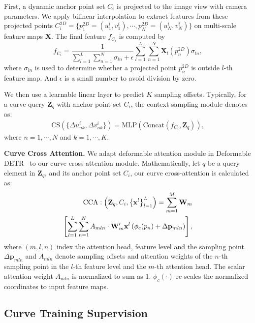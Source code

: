\documentclass[letterpaper, 10 pt, conference]{ieeeconf}
\newcommand{\bX}{\mathbf{X}}
\newcommand{\bx}{\mathbf{x}}
\newcommand{\bZ}{\mathbf{Z}}
\newcommand{\bW}{\mathbf{W}}
\newcommand{\bp}{\mathbf{p}}
\begin{document}
First, a dynamic anchor point set $C_i$ is projected to the image view with camera parameters. We apply bilinear interpolation to extract features from these projected points $C_i^{2D} = \{p_1^{2D}=(u_1^i,v_1^i), \cdots, p_N^{2D}=(u_N^i, v_N^i)\}$ on multi-scale feature maps ${\bX}$. 
The final feature $f_{C_i}$ is computed by
\begin{equation}
  f_{C_i} = \frac{1}{\sum_{l=1}^{L} \sum_{n=1}^{N}\sigma_{ln} + \epsilon} \sum_{l=1}^{L} \sum_{n=1}^{N}    \bX_{l}(p_n^{2D}) \sigma_{ln}, 
\end{equation}
where $\sigma_{ln}$ is used to determine whether a projected point $p_n^{2D}$ is outside $l$-th feature map. And $\epsilon$ is a small number to avoid division by zero.

We then use a learnable linear layer to predict $K$ sampling offsets. Typically, for a curve query $\bZ_q$ with anchor point set $C_i$, the context sampling module denotes as:
\begin{align}
    \text{CS}(\{\Delta u_{nk}^i, \Delta v_{nk}^i\}) = \text{MLP} (\text{Concat}(f_{C_i}, \bZ_q)),
\label{context-sampling}
\end{align}
where $n=1,\cdots, N$ and $k=1,\cdots, K$.

\noindent\textbf{Curve Cross Attention.} We adapt deformable attention module in Deformable
DETR~\cite{zhu2020deformable} to our curve cross-attention module.
Mathematically, let $q$ be a query element in $\bZ_q$, and its anchor point set $C_i$, our curve cross-attention is calculated as:
\begin{align}
     \text{CCA}:\left(\bZ_q, C_i,\left\{\bx^l\right\}_{l=1}^L\right)= 
     \sum_{m=1}^M \bW_m \notag \\
     \left[\sum_{l=1}^L \sum_{n=1}^N A_{m l n} \cdot \bW_m^{\prime} \bx^l\left(\phi_c (p_n)+\Delta \bp_{m l  n}\right)\right],
\label{cross-attn}
\end{align}
where $(m,l,n)$ index the attention head, feature level and the sampling point. $\Delta \bp_{m l n}$ and $A_{m l n}$ denote sampling offsets and attention weights of the $n$-th sampling point in the $l$-th feature level and the $m$-th attention head. The scalar attention weight $A_{m l n}$ is normalized to sum as 1. $\phi_c (\cdot)$ re-scales the normalized coordinates to input feature maps.


\subsection{Curve Training Supervision}
\end{document}
